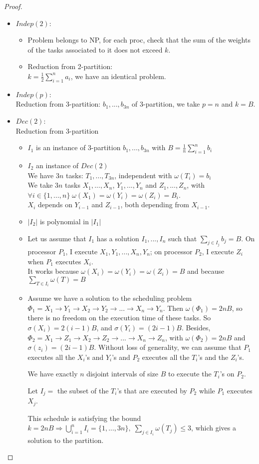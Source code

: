\documentclass{article}
\begin{document}
\begin{proof}
\begin{itemize}
\item $Indep(2)$:
\begin{itemize}
\item Problem belongs to NP, for each proc, check that the sum of the weights of the tasks associated to it does not exceed $k$.
\item Reduction from 2-partition:\\
$k=\frac{1}{2} \sum_{i=1}^{n}a_i$, we have an identical problem.
\end{itemize}
\item $Indep(p)$:\\
Reduction from 3-partition: $b_1,...,b_{3n}$ of 3-partition, we take $p=n$ and $k=B$.

\item $Dec(2)$:\\
Reduction from 3-partition
\begin{itemize}
\item $I_1$ is an instance of 3-partition $b_1,...,b_{3n}$ with $B=\frac{1}{n}\sum_{i=1}^n b_i$
\item $I_2$ an instance of $Dec(2)$\\
We have $3n$ tasks: $T_1,...,T_{3n}$, independent with $\omega (T_i)=b_i$\\
We take $3n$ tasks $X_1,...,X_n$, $Y_1,...,Y_n$ and $Z_1,...,Z_n$, with $\forall i \in \{1,...,n\} \; \omega (X_1) = \omega (Y_i) = \omega (Z_i) = B_i$.\\
$X_i$ depends on $Y_{i-1}$ and $Z_{i-1}$, both depending from $X_{i-1}$.
\item $|I_2|$ is polynomial in $|I_1|$
\item Let us assume that $I_1$ has a solution $I_1,...,I_n$ such that $\sum_{j\in I_j} b_j=B$. On processor $P_1$, I execute $X_1,Y_1,...,X_n,Y_n$; on processor $P_2$, I execute $Z_i$ when $P_1$ executes $X_i$.\\
It works because $\omega (X_i)=\omega (Y_i) =\omega (Z_i) = B$ and because $\sum_{T\in I_i} \omega(T) = B$
\item Assume we have a solution to the scheduling problem $\Phi_1=X_1 \to Y_1 \to X_2 \to Y_2 \to ... \to X_n \to Y_n$. Then $\omega(\Phi_1)=2nB$, so there is no freedom on the execution time of these tasks. So $\sigma (X_i)=2(i-1)B$, and $\sigma (Y_i)=(2i-1)B$.
Besides, $\Phi_2=X_1 \to Z_1 \to X_2 \to Z_2 \to ... \to X_n \to Z_n$, with $\omega(\Phi_2)=2nB$ and $\sigma(z_i)=(2i-1)B$. Without loss of generality, we can assume that $P_1$ executes all the $X_i$'s and $Y_i$'s and $P_2$ executes all the $T_i$'s and the $Z_i$'s.

We have exactly $n$ disjoint intervals of size $B$ to execute the $T_i$'s on $P_2$.

Let $I_j=$ the subset of the $T_i$'s that are executed by $P_2$ while $P_1$ executes $X_j$.

This schedule is satisfying the bound $k=2nB \Rightarrow \bigcup_{i=1}^n I_i = \{ 1,...,3n\}, \; \sum_{j\in I_i} \omega(T_j)\leq 3$, which gives a solution to the partition.
\end{itemize}
\end{itemize}
\end{proof}
\end{document}
